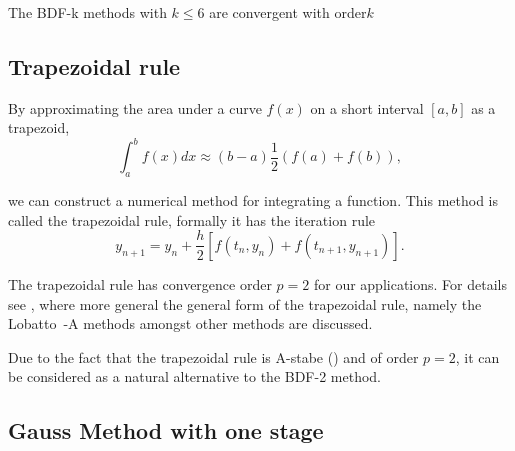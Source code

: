 	\begin{corollary}
		The BDF-k methods with $k \leq 6$ are convergent with order$k$
	\end{corollary}
	
	
\subsection{Trapezoidal rule}
	\label{sec:Trapezoidal}
	
	By approximating the area under a curve $f(x)$ on a short interval $[a,b]$ as a trapezoid, 
	\begin{displaymath}
		\int_{a}^{b} f(x) dx \approx (b-a)\frac{1}{2} (f(a)+f(b)),
	\end{displaymath}
	
	we can construct a numerical method for integrating a function. This method is called the trapezoidal rule, formally it has the iteration rule
	\begin{displaymath}
		y_{n+1} = y_n +\frac{h}{2}[f(t_n,y_n) + f(t_{n+1}, y_{n+1})].
	\end{displaymath}
	
	
	The trapezoidal rule has convergence order $p=2$ for our applications. For details see \cite{HairerErnst1989Tnso}, where more general the general form of the trapezoidal rule, namely the Lobatto~-A methods amongst other methods are discussed.
	
	Due to the fact that the trapezoidal rule is A-stabe  (\cite{ModellingAndDiscretizationOfCircuitProblems}) and of order $p=2$, it can be considered as a natural alternative to the BDF-2 method.
	
	
\subsection{Gauss Method with one stage}
	\label{sec:Gauss1}

